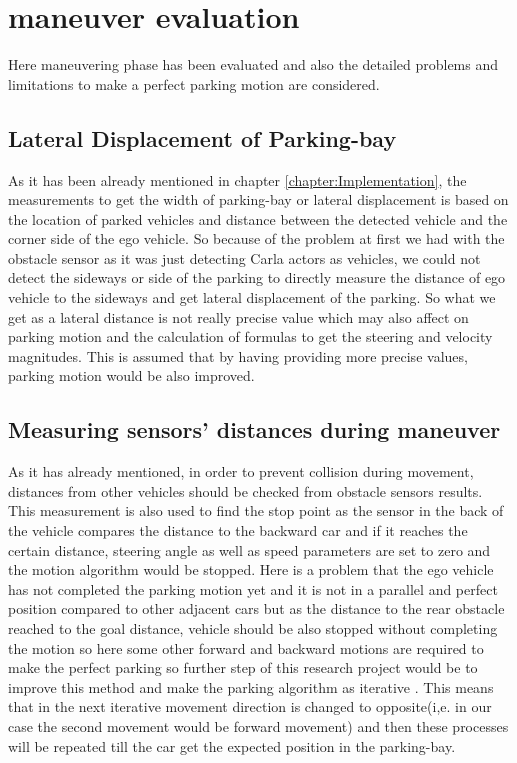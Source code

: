 \section{maneuver evaluation}
Here maneuvering phase has been evaluated and also the detailed problems and limitations to make a perfect parking motion are considered.
\subsection{Lateral Displacement of Parking-bay}
As it has been already mentioned in chapter \ref{chapter:Implementation}, the measurements to get the width of parking-bay or lateral displacement is based on the location of parked vehicles and distance between the detected vehicle and the corner side of the ego vehicle. So because of the problem at first we had with the obstacle sensor as it was just detecting Carla actors as vehicles, we could not detect the sideways or side of the parking to directly measure the distance of ego vehicle to the sideways and get lateral displacement of the parking. So what we get as a lateral distance is not really precise value which may also affect on parking motion and the calculation of formulas to get the steering and velocity magnitudes. This is assumed that by having providing more precise values, parking motion would be also improved.
\subsection{Measuring sensors' distances during maneuver}
As it has already mentioned, in order to prevent collision during movement, distances from other vehicles should be checked from obstacle sensors results. This measurement is also used to find the stop point as the sensor in the back of the vehicle compares the distance to the backward car and if it reaches the certain distance, steering angle as well as speed parameters are set to zero and the motion algorithm would be stopped. Here is a problem that the ego vehicle has not completed the parking motion yet and it is not in a parallel and perfect position compared to other adjacent cars but as the distance to the rear obstacle reached to the goal distance, vehicle should be also stopped without completing the motion so here some other forward and backward motions are required to make the perfect parking so further step of this research project would be to improve this method and make the parking algorithm as iterative \cite{parkingManeuver}. This means that in the next iterative movement direction is changed to opposite(i,e. in our case the second movement would be forward movement) and then these processes will be repeated till the car get the expected position in the parking-bay.
